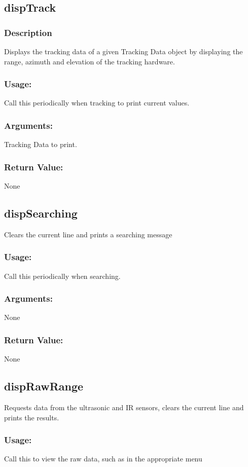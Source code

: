 \documentclass[]{report}
\begin{document}
\subsection{dispTrack}
\subsubsection{Description}
Displays the tracking data of a given Tracking Data object by displaying the range, azimuth and elevation of the tracking hardware.
\subsubsection{Usage:}
Call this periodically when tracking to print current values. 
\subsubsection{Arguments:}
Tracking Data to print.
\subsubsection{Return Value:}
None

\subsection{dispSearching}
Clears the current line and prints a searching message
\subsubsection{Usage:}
Call this periodically when searching. 
\subsubsection{Arguments:}
None
\subsubsection{Return Value:}
None

\subsection{dispRawRange}
Requests data from the ultrasonic and IR sensors, clears the current line and prints the results.
\subsubsection{Usage:}
Call this to view the raw data, such as in the appropriate menu 
\end{document}

